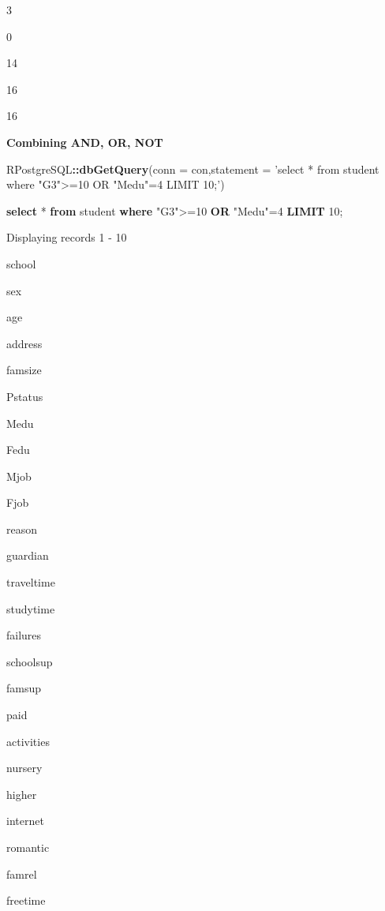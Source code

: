\documentclass[]{book}
\newenvironment{Shaded}{\begin{snugshade}}{\end{snugshade}}
\newcommand{\KeywordTok}[1]{\textcolor[rgb]{0.13,0.29,0.53}{\textbf{#1}}}
\newcommand{\DataTypeTok}[1]{\textcolor[rgb]{0.13,0.29,0.53}{#1}}
\newcommand{\DecValTok}[1]{\textcolor[rgb]{0.00,0.00,0.81}{#1}}
\newcommand{\StringTok}[1]{\textcolor[rgb]{0.31,0.60,0.02}{#1}}
\newcommand{\OtherTok}[1]{\textcolor[rgb]{0.56,0.35,0.01}{#1}}
\newcommand{\OperatorTok}[1]{\textcolor[rgb]{0.81,0.36,0.00}{\textbf{#1}}}
\newcommand{\NormalTok}[1]{#1}
\begin{document}
3

0

14

16

16

\textbf{Combining AND, OR, NOT}

\begin{Shaded}
\begin{Highlighting}[]
\NormalTok{RPostgreSQL}\OperatorTok{::}\KeywordTok{dbGetQuery}\NormalTok{(}\DataTypeTok{conn =}\NormalTok{ con,}\DataTypeTok{statement =} \StringTok{'select * from student where "G3">=10 OR "Medu"=4 LIMIT 10;'}\NormalTok{)}
\end{Highlighting}
\end{Shaded}

\begin{Shaded}
\begin{Highlighting}[]
\KeywordTok{select}\NormalTok{ * }\KeywordTok{from}\NormalTok{ student }\KeywordTok{where} \OtherTok{"G3"}\NormalTok{>=}\DecValTok{10} \KeywordTok{OR} \OtherTok{"Medu"}\NormalTok{=}\DecValTok{4} \KeywordTok{LIMIT} \DecValTok{10}\NormalTok{;}
\end{Highlighting}
\end{Shaded}

\label{tab:unnamed-chunk-32}Displaying records 1 - 10

school

sex

age

address

famsize

Pstatus

Medu

Fedu

Mjob

Fjob

reason

guardian

traveltime

studytime

failures

schoolsup

famsup

paid

activities

nursery

higher

internet

romantic

famrel

freetime
\end{document}
